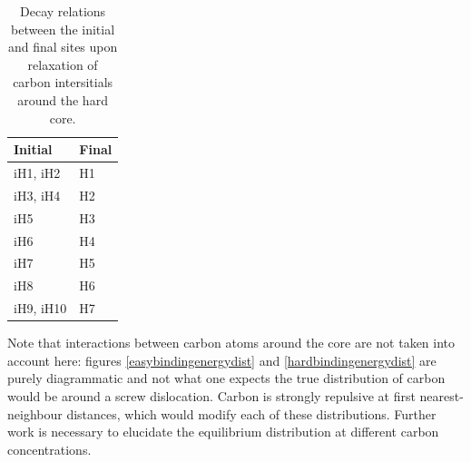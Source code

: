 \documentclass[a4paper,11pt]{article}
\begin{document}
\begin{table}[htbp]
\caption{\label{tab:org1c0476e}
Decay relations between the initial and final sites upon relaxation of carbon intersitials around the hard core.}
\centering
\begin{tabular}{ll}
Initial & Final\\
\hline
iH1, iH2 & H1\\
iH3, iH4 & H2\\
iH5 & H3\\
iH6 & H4\\
iH7 & H5\\
iH8 & H6\\
iH9, iH10 & H7\\
\end{tabular}
\end{table}


Note that interactions between carbon atoms around the core are not taken into account here:
figures \ref{easybindingenergydist} and \ref{hardbindingenergydist} are purely diagrammatic and not
what one expects the true distribution of carbon would be around a screw dislocation. Carbon is strongly
repulsive at first nearest-neighbour distances, which would modify each of these
distributions. Further work is necessary to elucidate the equilibrium distribution at different
carbon concentrations. 
\end{document}

